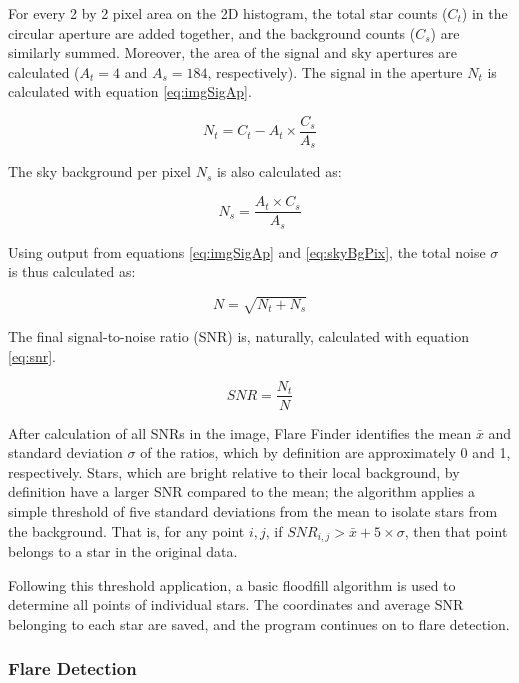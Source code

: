 \documentclass{article}
\begin{document}
\begin{multicols}{2}
For every 2 by 2 pixel area on the 2D histogram, the total star counts (\(C_t\)) in the circular aperture are added together, and the background counts (\(C_s\)) are similarly summed. Moreover, the area of the signal and sky apertures are calculated (\(A_t = 4\) and \(A_s = 184\), respectively). The signal in the aperture \(N_t\) is calculated with equation \ref{eq:imgSigAp}.
    
\begin{equation} \label{eq:imgSigAp}
    N_t = C_t - A_t \times \frac{C_s}{A_s}
\end{equation}

The sky background per pixel \(N_s\) is also calculated as:

\begin{equation} \label{eq:skyBgPix}
    N_s = \frac{A_t \times C_s}{A_s}
\end{equation}

Using output from equations \ref{eq:imgSigAp} and \ref{eq:skyBgPix}, the total noise \(\sigma\) is thus calculated as:

\begin{equation} \label{eq:imgTotNoise}
    N = \sqrt{N_t + N_s}
\end{equation}

The final signal-to-noise ratio (SNR) is, naturally, calculated with equation \ref{eq:snr}.

\begin{equation} \label{eq:snr}
    SNR = \frac{N_t}{N}
\end{equation}

After calculation of all SNRs in the image, Flare Finder identifies the mean \(\bar{x}\) and standard deviation \(\sigma\) of the ratios, which by definition are approximately 0 and 1, respectively. Stars, which are bright relative to their local background, by definition have a larger SNR compared to the mean; the algorithm applies a simple threshold of five standard deviations from the mean to isolate stars from the background. That is, for any point $i, j$, if \(SNR_{i, j} > \bar{x} + 5 \times \sigma\), then that point belongs to a star in the original data. 

Following this threshold application, a basic floodfill algorithm is used to determine all points of individual stars. The coordinates and average SNR belonging to each star are saved, and the program continues on to flare detection.

\subsubsection{Flare Detection} \label{sss:flareDetect}


\end{multicols}
\end{document}
